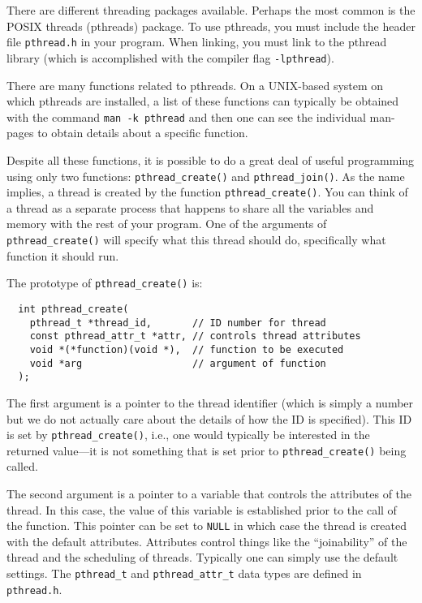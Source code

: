 There are different threading packages available.  Perhaps the most
common is the POSIX threads (pthreads) package.  To use pthreads, you
must include the header file {\tt pthread.h} in your program.  When
linking, you must link to the pthread library (which is accomplished
with the compiler flag {\tt -lpthread}).

There are many functions related to pthreads.  On a UNIX-based system
on which pthreads are installed, a list of these functions can
typically be obtained with the command {\tt man -k pthread} and then
one can see the individual man-pages to obtain details about a
specific function.

Despite all these functions, it is possible to do a great deal of
useful programming using only two functions: {\tt pthread\_create()}
and {\tt pthread\_join()}.  As the name implies, a thread is created
by the function {\tt pthread\_create()}.  You can think of a thread as
a separate process that happens to share all the variables and memory
with the rest of your program.  One of the arguments of {\tt
  pthread\_create()} will specify what this thread should do,
specifically what function it should run.

The prototype of {\tt pthread\_create()} is:
\begin{lstlisting}
  int pthread_create(
    pthread_t *thread_id,       // ID number for thread
    const pthread_attr_t *attr, // controls thread attributes
    void *(*function)(void *),  // function to be executed
    void *arg                   // argument of function
  );
\end{lstlisting}
The first argument is a pointer to the thread identifier (which is
simply a number but we do not actually care about the details of how
the ID is specified).  This ID is set by {\tt pthread\_create()},
i.e., one would typically be interested in the returned value---it is
not something that is set prior to {\tt pthread\_create()} being
called.

The second argument is a pointer to a variable that controls the
attributes of the thread.  In this case, the value of this variable is
established prior to the call of the function.  This pointer can be
set to {\tt NULL} in which case the thread is created with the default
attributes.  Attributes control things like the ``joinability'' of the
thread and the scheduling of threads.  Typically one can simply use
the default settings.  The {\tt pthread\_t} and {\tt pthread\_attr\_t}
data types are defined in {\tt pthread.h}.


